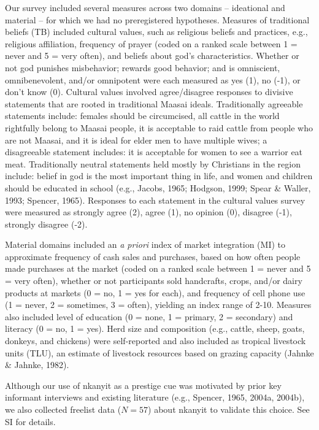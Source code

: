 \documentclass[
  11pt,
]{article}
\begin{document}
Our survey included several measures across two domains -- ideational
and material -- for which we had no preregistered hypotheses. Measures
of traditional beliefs (TB) included cultural values, such as religious
beliefs and practices, e.g., religious affiliation, frequency of prayer
(coded on a ranked scale between 1 = never and 5 = very often), and
beliefs about god's characteristics. Whether or not god punishes
misbehavior; rewards good behavior; and is omniscient, omnibenevolent,
and/or omnipotent were each measured as yes (1), no (-1), or don't know
(0). Cultural values involved agree/disagree responses to divisive
statements that are rooted in traditional Maasai ideals. Traditionally
agreeable statements include: females should be circumcised, all cattle
in the world rightfully belong to Maasai people, it is acceptable to
raid cattle from people who are not Maasai, and it is ideal for elder
men to have multiple wives; a disagreeable statement includes: it is
acceptable for women to see a warrior eat meat. Traditionally neutral
statements held mostly by Christians in the region include: belief in
god is the most important thing in life, and women and children should
be educated in school (e.g., Jacobs, 1965; Hodgson, 1999; Spear \&
Waller, 1993; Spencer, 1965). Responses to each statement in the
cultural values survey were measured as strongly agree (2), agree (1),
no opinion (0), disagree (-1), strongly disagree (-2).

Material domains included an \emph{a priori} index of market integration
(MI) to approximate frequency of cash sales and purchases, based on how
often people made purchases at the market (coded on a ranked scale
between 1 = never and 5 = very often), whether or not participants sold
handcrafts, crops, and/or dairy products at markets (0 = no, 1 = yes for
each), and frequency of cell phone use (1 = never, 2 = sometimes, 3 =
often), yielding an index range of 2-10. Measures also included level of
education (0 = none, 1 = primary, 2 = secondary) and literacy (0 = no, 1
= yes). Herd size and composition (e.g., cattle, sheep, goats, donkeys,
and chickens) were self-reported and also included as tropical livestock
units (TLU), an estimate of livestock resources based on grazing
capacity (Jahnke \& Jahnke, 1982).

Although our use of nkanyit as a prestige cue was motivated by prior key
informant interviews and existing literature (e.g., Spencer, 1965,
2004a, 2004b), we also collected freelist data (\(N=57\)) about nkanyit
to validate this choice. See SI for details.
\end{document}
